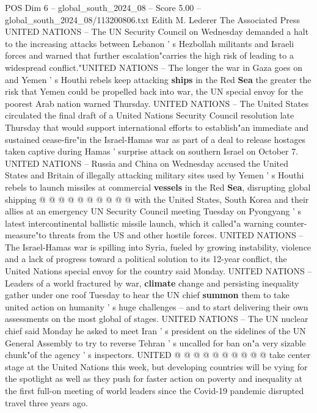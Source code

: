 \begin{textsample}{POS Dim 6 – global\_south\_2024\_08 – Score 5.00 – global\_south\_2024\_08/113200806.txt}  \label{ex:f6_pos_388}
Edith M.
Lederer The Associated Press UNITED NATIONS -- The UN Security Council on Wednesday demanded a halt to the increasing attacks between Lebanon ' s Hezbollah militants and Israeli forces and warned that further escalation"carries the high risk of leading to a widespread conflict."UNITED NATIONS -- The longer the war in Gaza goes on and Yemen ' s Houthi rebels keep attacking \textbf{ships} in the Red \textbf{Sea} the greater the risk that Yemen could be propelled back into war, the UN special envoy for the poorest Arab nation warned Thursday.
UNITED NATIONS -- The United States circulated the final draft of a United Nations Security Council resolution late Thursday that would support international efforts to establish"an immediate and sustained cease-fire"in the Israel-Hamas war as part of a deal to release hostages taken captive during Hamas ' surprise attack on southern Israel on October 7.
UNITED NATIONS -- Russia and China on Wednesday accused the United States and Britain of illegally attacking military sites used by Yemen ' s Houthi rebels to launch missiles at commercial \textbf{vessels} in the Red \textbf{Sea}, disrupting global shipping @ @ @ @ @ @ @ @ @ @ with the United States, South Korea and their allies at an emergency UN Security Council meeting Tuesday on Pyongyang ' s latest intercontinental ballistic missile launch, which it called"a warning counter-measure"to threats from the US and other hostile forces.
UNITED NATIONS -- The Israel-Hamas war is spilling into Syria, fueled by growing instability, violence and a lack of progress toward a political solution to its 12-year conflict, the United Nations special envoy for the country said Monday.
UNITED NATIONS -- Leaders of a world fractured by war, \textbf{climate} change and persisting inequality gather under one roof Tuesday to hear the UN chief \textbf{summon} them to take united action on humanity ' s huge challenges -- and to start delivering their own assessments on the most global of stages.
UNITED NATIONS -- The UN nuclear chief said Monday he asked to meet Iran ' s president on the sidelines of the UN General Assembly to try to reverse Tehran ' s uncalled for ban on"a very sizable chunk"of the agency ' s inspectors.
UNITED @ @ @ @ @ @ @ @ @ @ take center stage at the United Nations this week, but developing countries will be vying for the spotlight as well as they push for faster action on poverty and inequality at the first full-on meeting of world leaders since the Covid-19 pandemic disrupted travel three years ago.

\end{textsample}
